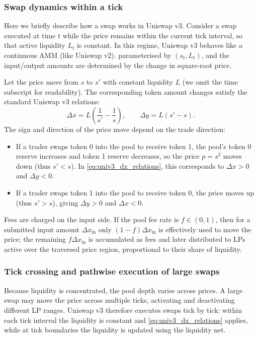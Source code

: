 \documentclass[11pt]{article}
\begin{document}
\subsubsection{Swap dynamics within a tick}
Here we briefly describe how a swap works in Uniswap v3.
Consider a swap executed at time $t$ while the price remains within the current tick interval, so that active liquidity $L_t$ is constant. In this regime, Uniswap v3 behaves like a continuous AMM (like Uniswap v2). parameterised by $(s_t, L_t)$, and the input/output amounts are determined by the change in square-root price.

Let the price move from $s$ to $s'$ with constant liquidity $L$ (we omit the time subscript for readability).
The corresponding token amount changes satisfy the standard Uniswap v3 relations:
\begin{equation}
  \Delta x = L\!\left(\frac{1}{s'} - \frac{1}{s}\right),
  \qquad
  \Delta y = L\!\left(s' - s\right).
  \label{eq:univ3_dx_relations}
\end{equation}
The sign and direction of the price move depend on the trade direction:
\begin{itemize}[leftmargin=*]
  \item If a trader swaps token 0 into the pool to receive token 1, the pool's token 0 reserve increases and token 1 reserve decreases, so the price $p=s^2$ moves down (thus $s' < s$). In \eqref{eq:univ3_dx_relations}, this corresponds to $\Delta x>0$ and $\Delta y<0$.
  \item If a trader swaps token 1 into the pool to receive token 0, the price moves up (thus $s' > s$), giving $\Delta y>0$ and $\Delta x<0$.
\end{itemize}

Fees are charged on the input side. If the pool fee rate is $f \in (0,1)$, then for a submitted input amount $\Delta x_{\mathrm{in}}$ only $(1-f)\Delta x_{\mathrm{in}}$ is effectively used to move the price; the remaining $f\Delta x_{\mathrm{in}}$ is accumulated as fees and later distributed to LPs active over the traversed price region, proportional to their share of liquidity.

\subsubsection{Tick crossing and pathwise execution of large swaps}

Because liquidity is concentrated, the pool depth varies across prices. A large swap may move the price across multiple ticks, activating and deactivating different LP ranges. Uniswap v3 therefore executes swaps tick by tick:
within each tick interval the liquidity is constant and \eqref{eq:univ3_dx_relations} applies, while at tick boundaries the liquidity is updated using the liquidity net.
\end{document}
